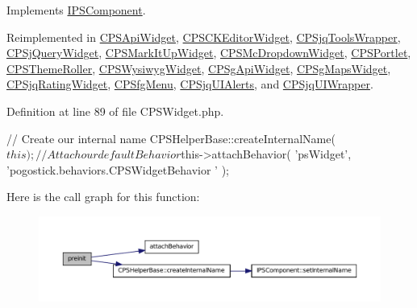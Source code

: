 Implements \hyperlink{interfaceIPSComponent_a2dc262e99b1c246b56f27626bfe699ff}{IPSComponent}.



Reimplemented in \hyperlink{classCPSApiWidget_a2dc262e99b1c246b56f27626bfe699ff}{CPSApiWidget}, \hyperlink{classCPSCKEditorWidget_a2dc262e99b1c246b56f27626bfe699ff}{CPSCKEditorWidget}, \hyperlink{classCPSjqToolsWrapper_a2dc262e99b1c246b56f27626bfe699ff}{CPSjqToolsWrapper}, \hyperlink{classCPSjQueryWidget_a2dc262e99b1c246b56f27626bfe699ff}{CPSjQueryWidget}, \hyperlink{classCPSMarkItUpWidget_a2dc262e99b1c246b56f27626bfe699ff}{CPSMarkItUpWidget}, \hyperlink{classCPSMcDropdownWidget_a2dc262e99b1c246b56f27626bfe699ff}{CPSMcDropdownWidget}, \hyperlink{classCPSPortlet_a2dc262e99b1c246b56f27626bfe699ff}{CPSPortlet}, \hyperlink{classCPSThemeRoller_a2dc262e99b1c246b56f27626bfe699ff}{CPSThemeRoller}, \hyperlink{classCPSWysiwygWidget_a2dc262e99b1c246b56f27626bfe699ff}{CPSWysiwygWidget}, \hyperlink{classCPSgApiWidget_a2dc262e99b1c246b56f27626bfe699ff}{CPSgApiWidget}, \hyperlink{classCPSgMapsWidget_a2dc262e99b1c246b56f27626bfe699ff}{CPSgMapsWidget}, \hyperlink{classCPSjqRatingWidget_a2dc262e99b1c246b56f27626bfe699ff}{CPSjqRatingWidget}, \hyperlink{classCPSfgMenu_a2dc262e99b1c246b56f27626bfe699ff}{CPSfgMenu}, \hyperlink{classCPSjqUIAlerts_a2dc262e99b1c246b56f27626bfe699ff}{CPSjqUIAlerts}, and \hyperlink{classCPSjqUIWrapper_a2dc262e99b1c246b56f27626bfe699ff}{CPSjqUIWrapper}.



Definition at line 89 of file CPSWidget.php.




\begin{DoxyCode}
    {
        //  Create our internal name
        CPSHelperBase::createInternalName( $this );

        //  Attach our default Behavior
        $this->attachBehavior( 'psWidget', 'pogostick.behaviors.CPSWidgetBehavior
      ' );
    }
\end{DoxyCode}




Here is the call graph for this function:\nopagebreak
\begin{figure}[H]
\begin{center}
\leavevmode
\includegraphics[width=400pt]{classCPSWidget_a2dc262e99b1c246b56f27626bfe699ff_cgraph}
\end{center}
\end{figure}




